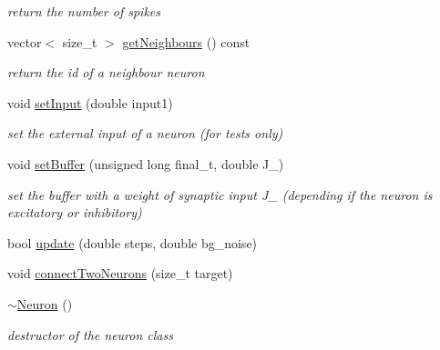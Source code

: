 \begin{DoxyCompactItemize}
\begin{DoxyCompactList}\small\item\em return the number of spikes \end{DoxyCompactList}\item 
\hypertarget{classNeuron_a4df5e8822dc8a6d95cff556bd31fe471}{vector$<$ size\-\_\-t $>$ \hyperlink{classNeuron_a4df5e8822dc8a6d95cff556bd31fe471}{get\-Neighbours} () const }\label{classNeuron_a4df5e8822dc8a6d95cff556bd31fe471}

\begin{DoxyCompactList}\small\item\em return the id of a neighbour neuron \end{DoxyCompactList}\item 
\hypertarget{classNeuron_ad1fd76083e7286403100452ff405514c}{void \hyperlink{classNeuron_ad1fd76083e7286403100452ff405514c}{set\-Input} (double input1)}\label{classNeuron_ad1fd76083e7286403100452ff405514c}

\begin{DoxyCompactList}\small\item\em set the external input of a neuron (for tests only) \end{DoxyCompactList}\item 
\hypertarget{classNeuron_ac4dadcc29587180a55d282dc78140180}{void \hyperlink{classNeuron_ac4dadcc29587180a55d282dc78140180}{set\-Buffer} (unsigned long final\-\_\-t, double J\-\_\-)}\label{classNeuron_ac4dadcc29587180a55d282dc78140180}

\begin{DoxyCompactList}\small\item\em set the buffer with a weight of synaptic input J\-\_\- (depending if the neuron is excitatory or inhibitory) \end{DoxyCompactList}\item 
bool \hyperlink{classNeuron_a65c37fca235cfde14a54d23d90b7e6e6}{update} (double steps, double bg\-\_\-noise)
\item 
void \hyperlink{classNeuron_a367148f52e712682da9d0c278353f7ed}{connect\-Two\-Neurons} (size\-\_\-t target)
\item 
\hypertarget{classNeuron_a94a250ce7e167760e593979b899745b1}{\hyperlink{classNeuron_a94a250ce7e167760e593979b899745b1}{$\sim$\-Neuron} ()}\label{classNeuron_a94a250ce7e167760e593979b899745b1}

\begin{DoxyCompactList}\small\item\em destructor of the neuron class \end{DoxyCompactList}\end{DoxyCompactItemize}
